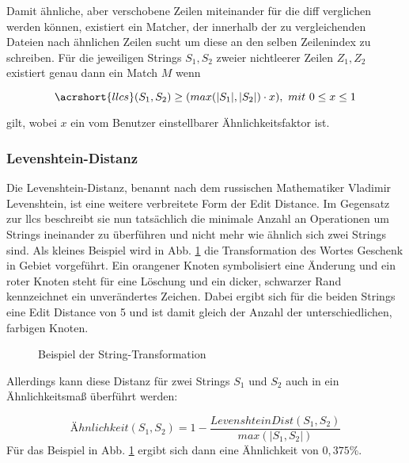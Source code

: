 Damit ähnliche, aber verschobene Zeilen miteinander für die \acrshort{diff} verglichen werden können, existiert ein Matcher, der innerhalb der zu vergleichenden Dateien nach ähnlichen Zeilen sucht um diese an den selben Zeilenindex zu schreiben. Für die jeweiligen Strings $S_1, S_2$ zweier nichtleerer Zeilen $Z_1, Z_2$ existiert genau dann ein Match $M$ wenn

\begin{equation}
    \acrshort{llcs}(S_1,S_2) \geq (max(|S_1|, |S_2| ) \cdot x), \ mit \ 0 \leq x \leq 1
    \label{eq:matchat}
\end{equation}

gilt, wobei $x$ ein vom Benutzer einstellbarer Ähnlichkeitsfaktor ist. 


\subsubsection{Levenshtein-Distanz}\label{Levenshtein-Distanz}

Die Levenshtein-Distanz, benannt nach dem russischen Mathematiker Vladimir Levenshtein, ist eine weitere verbreitete Form der Edit Distance. Im Gegensatz zur \acrshort{llcs} beschreibt sie nun tatsächlich die minimale Anzahl an Operationen um Strings ineinander zu überführen und nicht mehr wie ähnlich sich zwei Strings sind. Als kleines Beispiel wird in Abb. \ref{fig:editDist} die Transformation des Wortes \glqq Geschenk\grqq{} in \glqq Gebiet\grqq{} vorgeführt. Ein orangener Knoten symbolisiert eine Änderung und ein roter Knoten steht für eine Löschung und ein dicker, schwarzer Rand kennzeichnet ein unverändertes Zeichen. Dabei ergibt sich für die beiden Strings eine Edit Distance von 5 und ist damit gleich der Anzahl der unterschiedlichen, farbigen Knoten.

\begin{figure}
    
    \caption{Beispiel der String-Transformation}
    \label{fig:editDist}
\end{figure}

Allerdings kann diese Distanz für zwei Strings $S_1$ und $S_2$ auch in ein Ähnlichkeitsmaß überführt werden:

\begin{equation}
    Ähnlichkeit(S_1, S_2) = 1 - \frac{LevenshteinDist(S_1, S_2)}{max(|S_1, S_2|)}
    \label{eq:similarityFunc}
\end{equation}
Für das Beispiel in Abb. \ref{fig:editDist} ergibt sich dann eine Ähnlichkeit von $0,375\%$. 

